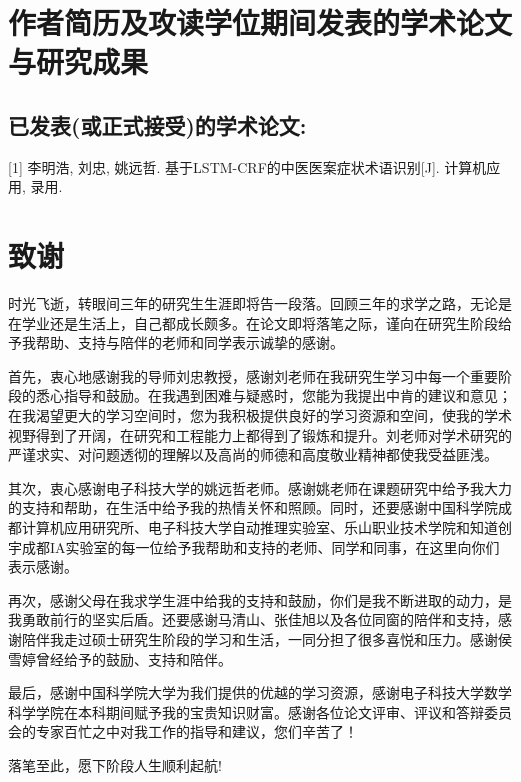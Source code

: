 \chapter{作者简历及攻读学位期间发表的学术论文与研究成果}

\section*{已发表(或正式接受)的学术论文:}

[1] 李明浩, 刘忠, 姚远哲. 基于LSTM-CRF的中医医案症状术语识别[J]. 计算机应用, 录用.

\chapter{致\quad 谢}
时光飞逝，转眼间三年的研究生生涯即将告一段落。回顾三年的求学之路，无论是在学业还是生活上，自己都成长颇多。在论文即将落笔之际，谨向在研究生阶段给予我帮助、支持与陪伴的老师和同学表示诚挚的感谢。

首先，衷心地感谢我的导师刘忠教授，感谢刘老师在我研究生学习中每一个重要阶段的悉心指导和鼓励。在我遇到困难与疑惑时，您能为我提出中肯的建议和意见；在我渴望更大的学习空间时，您为我积极提供良好的学习资源和空间，使我的学术视野得到了开阔，在研究和工程能力上都得到了锻炼和提升。刘老师对学术研究的严谨求实、对问题透彻的理解以及高尚的师德和高度敬业精神都使我受益匪浅。

其次，衷心感谢电子科技大学的姚远哲老师。感谢姚老师在课题研究中给予我大力的支持和帮助，在生活中给予我的热情关怀和照顾。同时，还要感谢中国科学院成都计算机应用研究所、电子科技大学自动推理实验室、乐山职业技术学院和知道创宇成都IA实验室的每一位给予我帮助和支持的老师、同学和同事，在这里向你们表示感谢。

再次，感谢父母在我求学生涯中给我的支持和鼓励，你们是我不断进取的动力，是我勇敢前行的坚实后盾。还要感谢马清山、张佳旭以及各位同窗的陪伴和支持，感谢陪伴我走过硕士研究生阶段的学习和生活，一同分担了很多喜悦和压力。感谢侯雪婷曾经给予的鼓励、支持和陪伴。

最后，感谢中国科学院大学为我们提供的优越的学习资源，感谢电子科技大学数学科学学院在本科期间赋予我的宝贵知识财富。感谢各位论文评审、评议和答辩委员会的专家百忙之中对我工作的指导和建议，您们辛苦了！

落笔至此，愿下阶段人生顺利起航!